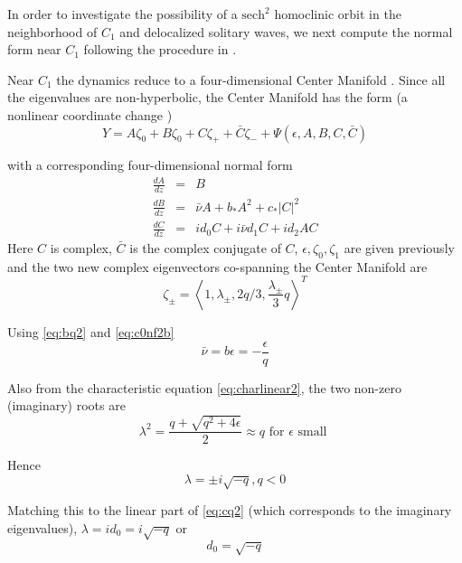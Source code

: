 In order to investigate the possibility of a $ \mathrm{sech}^2 $  homoclinic orbit in
the neighborhood of $C_1$ and delocalized solitary waves, we next compute the
normal form near $C_1$ following the procedure in \cite{IA}.

Near $C_1$ the dynamics reduce to a four-dimensional Center Manifold \cite{IA}.
Since all the eigenvalues are non-hyperbolic, the Center Manifold has the form
(a nonlinear coordinate change \cite{IA})
\begin{equation} \label{eq:c1cm2}
Y = A \zeta_0 + B \zeta_0 + C \zeta_+ + \bar{C} \zeta_- + \Psi(\epsilon,A,B,C,\bar{C})
\end{equation}

with  a corresponding four-dimensional normal form
\begin{subequations}\label{eq:c1nf2}
\begin{eqnarray}
\frac{dA}{dz} &=& B \label{eq:aq2} \\
\frac{dB}{dz} &=& \bar{\nu} A + b_* A^2 + c_* \left|C\right|^2  \label{eq:bq2} \\
\frac{dC}{dz} &=& i d_0 C + i \bar{\nu} d_1 C + i d_2 A C \label{eq:cq2}
\end{eqnarray}
\end{subequations}
Here $C$ is complex, $\bar{C}$ is the complex conjugate of $C$, $\epsilon,
\zeta_0, \zeta_1$ are given previously and the two new complex eigenvectors
co-spanning the Center Manifold are
\begin{equation}
\zeta_\pm	 = \left< 1, \lambda_\pm, 2 q / 3, \frac{\lambda_\pm}{3} q\right>^T 
\end{equation}

Using \eqref{eq:bq2} and \eqref{eq:c0nf2b}
\begin{equation}
\bar{\nu} = b \epsilon = -\frac{\epsilon}{q} 
\end{equation}

Also from the characteristic equation \eqref{eq:charlinear2}, the two non-zero 
(imaginary) roots are 
\begin{equation}
\lambda^2 = \frac{ q + \sqrt{q^2 + 4 \epsilon } }{2} \approx q \textrm{ for } \epsilon \textrm{ small }
\end{equation}

Hence
\begin{equation}
\lambda = \pm i \sqrt{-q}, q < 0
\end{equation}

Matching this to the linear part of \eqref{eq:cq2} 
(which corresponds to the
imaginary eigenvalues), $\lambda = i d_0 = i \sqrt{-q}$ or 
\begin{equation}
d_0 = \sqrt{-q}
\end{equation}

